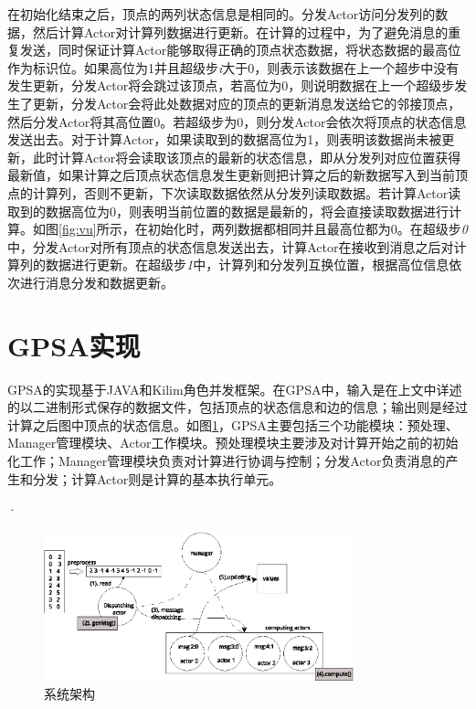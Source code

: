 在初始化结束之后，顶点的两列状态信息是相同的。分发Actor访问分发列的数据，然后计算Actor对计算列数据进行更新。在计算的过程中，为了避免消息的重复发送，同时保证计算Actor能够取得正确的顶点状态数据，将状态数据的最高位作为标识位。如果高位为1并且超级步\textit{i}大于0，则表示该数据在上一个超步中没有发生更新，分发Actor将会跳过该顶点，若高位为0，则说明数据在上一个超级步发生了更新，分发Actor会将此处数据对应的顶点的更新消息发送给它的邻接顶点，然后分发Actor将其高位置0。若超级步为0，则分发Actor会依次将顶点的状态信息发送出去。对于计算Actor，如果读取到的数据高位为1，则表明该数据尚未被更新，此时计算Actor将会读取该顶点的最新的状态信息，即从分发列对应位置获得最新值，如果计算之后顶点状态信息发生更新则把计算之后的新数据写入到当前顶点的计算列，否则不更新，下次读取数据依然从分发列读取数据。若计算Actor读取到的数据高位为0，则表明当前位置的数据是最新的，将会直接读取数据进行计算。如图\ref{fig:vu}所示，在初始化时，两列数据都相同并且最高位都为0。在超级步\textit{0}中，分发Actor对所有顶点的状态信息发送出去，计算Actor在接收到消息之后对计算列的数据进行更新。在超级步\textit{1}中，计算列和分发列互换位置，根据高位信息依次进行消息分发和数据更新。

\section{GPSA实现}

GPSA的实现基于JAVA和Kilim角色并发框架。在GPSA中，输入是在上文中详述的以二进制形式保存的数据文件，包括顶点的状态信息和边的信息；输出则是经过计算之后图中顶点的状态信息。如图\ref{fig:overview}，GPSA主要包括三个功能模块：预处理、Manager管理模块、Actor工作模块。预处理模块主要涉及对计算开始之前的初始化工作；Manager管理模块负责对计算进行协调与控制；分发Actor负责消息的产生和分发；计算Actor则是计算的基本执行单元。

·
\begin{figure}[htbp]
\centering
\includegraphics[width=0.8\textwidth]{myfigures/newexample.eps}
\caption{系统架构}\label{fig:overview}
\vspace{\baselineskip}
\end{figure}

